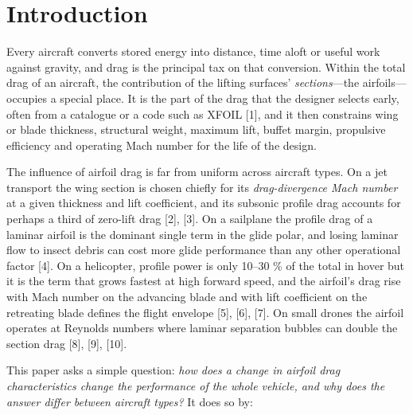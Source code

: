 \documentclass[10pt,a4paper,twocolumn]{article}
\begin{document}
\hypertarget{introduction}{%
\section{Introduction}\label{introduction}}

Every aircraft converts stored energy into distance, time aloft or
useful work against gravity, and drag is the principal tax on that
conversion. Within the total drag of an aircraft, the contribution of
the lifting surfaces' \emph{sections}---the airfoils---occupies a
special place. It is the part of the drag that the designer selects
early, often from a catalogue or a code such as XFOIL {[}1{]}, and it
then constrains wing or blade thickness, structural weight, maximum
lift, buffet margin, propulsive efficiency and operating Mach number for
the life of the design.

The influence of airfoil drag is far from uniform across aircraft types.
On a jet transport the wing section is chosen chiefly for its
\emph{drag-divergence Mach number} at a given thickness and lift
coefficient, and its subsonic profile drag accounts for perhaps a third
of zero-lift drag {[}2{]}, {[}3{]}. On a sailplane the profile drag of a
laminar airfoil is the dominant single term in the glide polar, and
losing laminar flow to insect debris can cost more glide performance
than any other operational factor {[}4{]}. On a helicopter, profile
power is only 10--30 \% of the total in hover but it is the term that
grows fastest at high forward speed, and the airfoil's drag rise with
Mach number on the advancing blade and with lift coefficient on the
retreating blade defines the flight envelope {[}5{]}, {[}6{]}, {[}7{]}.
On small drones the airfoil operates at Reynolds numbers where laminar
separation bubbles can double the section drag {[}8{]}, {[}9{]},
{[}10{]}.

This paper asks a simple question: \emph{how does a change in airfoil
drag characteristics change the performance of the whole vehicle, and
why does the answer differ between aircraft types?} It does so by:
\end{document}
